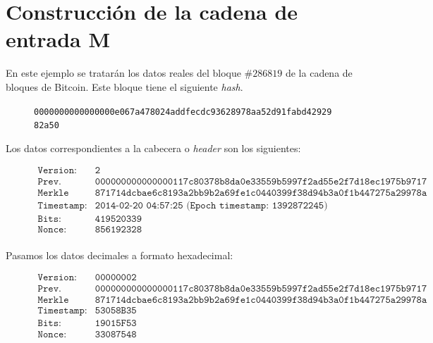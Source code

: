 \documentclass{article}
\begin{document}
    \vspace{3mm}
    
\section{Construcción de la cadena de entrada M}
    En este ejemplo se tratarán los datos reales del bloque $\#286819$ de la cadena de bloques de Bitcoin. Este bloque tiene el siguiente \textit{hash}.
    
    \begin{figure}[H]
        \centering
        \scriptsize{
        \texttt{0000000000000000e067a478024addfecdc93628978aa52d91fabd4292982a50}
        }
    \end{figure}
    
    Los datos correspondientes a la cabecera o \textit{header} son los siguientes:
    \begin{figure}[H]
    \centering
    \scriptsize{
        $\begin{array}{ll}
            \texttt{Version:} & \texttt{2} \\
            \texttt{Prev. Block:} & \texttt{000000000000000117c80378b8da0e33559b5997f2ad55e2f7d18ec1975b9717} \\
            \texttt{Merkle root:} & \texttt{871714dcbae6c8193a2bb9b2a69fe1c0440399f38d94b3a0f1b447275a29978a} \\
            \texttt{Timestamp:} & \texttt{2014-02-20 04:57:25 (Epoch timestamp: 1392872245)} \\
            \texttt{Bits:} & \texttt{419520339} \\
            \texttt{Nonce:} & \texttt{856192328} \\
        \end{array}$
    }
    \end{figure}
    
    Pasamos los datos decimales a formato hexadecimal:
    \begin{figure}[H]
    \centering
    \scriptsize{
        $\begin{array}{ll}
            \texttt{Version:} & \texttt{00000002} \\
            \texttt{Prev. Block:} & \texttt{000000000000000117c80378b8da0e33559b5997f2ad55e2f7d18ec1975b9717} \\
            \texttt{Merkle root:} & \texttt{871714dcbae6c8193a2bb9b2a69fe1c0440399f38d94b3a0f1b447275a29978a} \\
            \texttt{Timestamp:} & \texttt{53058B35} \\
            \texttt{Bits:} & \texttt{19015F53} \\
            \texttt{Nonce:} & \texttt{33087548} \\
        \end{array}$
    }
    \end{figure}
    
\end{document}
